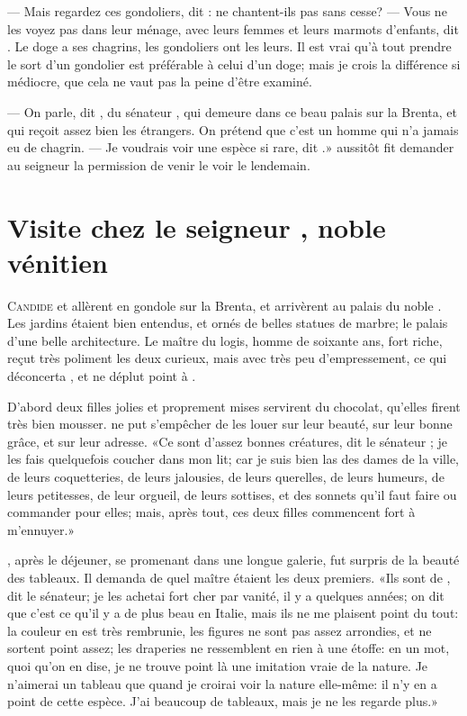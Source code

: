 — Mais regardez ces gondoliers, dit : ne
chantent-ils pas sans cesse? — Vous ne les voyez pas dans leur ménage,
avec leurs femmes et leurs marmots d’enfants, dit . Le doge a ses
chagrins, les gondoliers ont les leurs. Il est vrai qu’à tout prendre
le sort d’un gondolier est préférable à celui d’un doge; mais je crois
la différence si médiocre, que cela ne vaut pas la peine d’être
examiné.

— On parle, dit , du sénateur , qui demeure dans ce
beau palais sur la Brenta, et qui reçoit assez bien les étrangers. On
prétend que c’est un homme qui n’a jamais eu de chagrin. — Je voudrais
voir une espèce si rare, dit .»  aussitôt fit demander au
seigneur  la permission de venir le voir le lendemain.



\chapter[Visite chez le seigneur \bname{Pococurante}…]{Visite chez le seigneur , noble vénitien}


\lettrine{C}{andide} et  allèrent en gondole sur la Brenta, et arrivèrent au
palais du noble . Les jardins étaient bien entendus, et
ornés de belles statues de marbre; le palais d’une belle architecture.
Le maître du logis, homme de soixante ans, fort riche, reçut très
poliment les deux curieux, mais avec très peu d’empressement, ce qui
déconcerta , et ne déplut point à .


 D’abord deux filles jolies et proprement mises servirent du chocolat,
qu’elles firent très bien mousser.  ne put s’empêcher de les
louer sur leur beauté, sur leur bonne grâce, et sur leur adresse. «Ce
sont d’assez bonnes créatures, dit le sénateur ; je les fais
quelquefois coucher dans mon lit; car je suis bien las des dames de la
ville, de leurs coquetteries, de leurs jalousies, de leurs querelles,
de leurs humeurs, de leurs petitesses, de leur orgueil, de leurs
sottises, et des sonnets qu’il faut faire ou commander pour elles;
mais, après tout, ces deux filles commencent fort à m’ennuyer.»


, après le déjeuner, se promenant dans une longue galerie, fut
surpris de la beauté des tableaux. Il demanda de quel maître étaient
les deux premiers. «Ils sont de , dit le sénateur; je les achetai
fort cher par vanité, il y a quelques années; on dit que c’est ce qu’il
y a de plus beau en Italie, mais ils ne me plaisent point du tout: la
couleur en est très rembrunie, les figures ne sont pas assez arrondies,
et ne sortent point assez; les draperies ne ressemblent en rien à une
étoffe: en un mot, quoi qu’on en dise, je ne trouve point là une
imitation vraie de la nature. Je n’aimerai un tableau que quand je
croirai voir la nature elle-même: il n’y en a point de cette espèce.
J’ai beaucoup de tableaux, mais je ne les regarde plus.»

